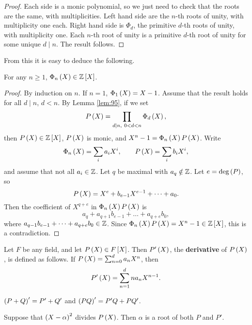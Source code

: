 \begin{proof}
Each side is a monic polynomial, so we just need to check that the roots are the same, with multiplicities. Left hand side are the $ n $-th roots of unity, with multiplicity one each. Right hand side is $ \Phi_d $, the primitive $ d $-th roots of unity, with multiplicity one. Each $ n $-th root of unity is a primitive $ d $-th root of unity for some unique $ d \mid n $. The result follows.
\end{proof}

From this it is easy to deduce the following.

\begin{lemma}
For any $ n \ge 1 $, $ \Phi_n\left( X \right) \in \mathbb{Z}\left[ X \right] $.
\end{lemma}

\begin{proof}
By induction on $ n $. If $ n = 1 $, $ \Phi_1\left( X \right) = X - 1 $. Assume that the result holds for all $ d \mid n $, $ d < n $. By Lemma \ref{lem:95}, if we set
$$ P\left( X \right) = \prod_{d \mid n, \ 0 < d < n} \Phi_d\left( X \right), $$
then $ P\left( X \right) \in \mathbb{Z}\left[ X \right] $, $ P\left( X \right) $ is monic, and $ X^n - 1 = \Phi_n\left( X \right)P\left( X \right) $. Write
$$ \Phi_n\left( X \right) = \sum_i a_iX^i, \qquad P\left( X \right) = \sum_i b_iX^i, $$
and assume that not all $ a_i \in \mathbb{Z} $. Let $ q $ be maximal with $ a_q \notin \mathbb{Z} $. Let $ e = \deg\left( P \right) $, so
$$ P\left( X \right) = X^e + b_{e - 1}X^{e - 1} + \dots + a_0. $$
Then the coefficient of $ X^{q + e} $ in $ \Phi_n\left( X \right)P\left( X \right) $ is
$$ a_q + a_{q + 1}b_{e - 1} + \dots + a_{q + e}b_0, $$
where $ a_{q - 1}b_{e - 1} + \dots + a_{q + e}b_0 \in \mathbb{Z} $. Since $ \Phi_n\left( X \right)P\left( X \right) = X^n - 1 \in \mathbb{Z}\left[ X \right] $, this is a contradiction.
\end{proof}

\begin{definition}
Let $ F $ be any field, and let $ P\left( X \right) \in F\left[ X \right] $. Then $ P'\left( X \right) $, the \textbf{derivative} of $ P\left( X \right) $, is defined as follows. If $ P\left( X \right) = \sum_{n = 0}^d a_nX^n $, then
$$ P'\left( X \right) = \sum_{n = 1}^d na_nX^{n - 1}. $$
\end{definition}

\begin{note*}
$ \left( P + Q \right)' = P' + Q' $ and $ \left( PQ \right)' = P'Q + PQ' $.
\end{note*}

\begin{lemma}
\label{lem:98}
Suppose that $ \left( X - \alpha \right)^2 $ divides $ P\left( X \right) $. Then $ \alpha $ is a root of both $ P $ and $ P' $.
\end{lemma}

